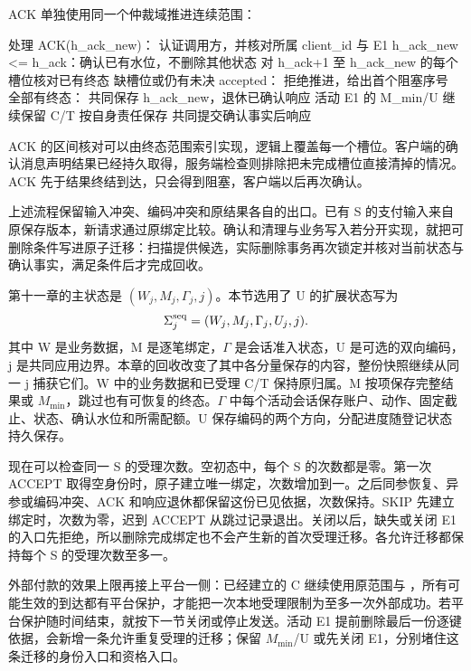 
ACK 单独使用同一个仲裁域推进连续范围：

\begin{BookCode}
处理 ACK(h_ack_new)：
    认证调用方，并核对所属 client_id 与 E1
    h_ack_new <= h_ack：确认已有水位，不删除其他状态
    对 h_ack+1 至 h_ack_new 的每个槽位核对已有终态
    缺槽位或仍有未决 accepted：
        拒绝推进，给出首个阻塞序号
    全部有终态：
        共同保存 h_ack_new，退休已确认响应
        活动 E1 的 M_min/U 继续保留
        C/T 按自身责任保存
    共同提交确认事实后响应
\end{BookCode}

ACK 的区间核对可以由终态范围索引实现，逻辑上覆盖每一个槽位。客户端的确认消息声明结果已经持久取得，服务端检查则排除把未完成槽位直接清掉的情况。ACK 先于结果终结到达，只会得到阻塞，客户端以后再次确认。

上述流程保留输入冲突、编码冲突和原结果各自的出口。已有 S 的支付输入来自原保存版本，新请求通过原绑定比较。确认和清理与业务写入若分开实现，就把可删除条件写进原子迁移：扫描提供候选，实际删除事务再次锁定并核对当前状态与确认事实，满足条件后才完成回收。

第十一章的主状态是 $(W_j,M_j,\Gamma_j,j)$。本节选用了 U 的扩展状态写为
\[
\Sigma^{\rm seq}_j=(W_j,M_j,\Gamma_j,U_j,j).
\]
其中 W 是业务数据，M 是逐笔绑定，$\Gamma$ 是会话准入状态，U 是可选的双向编码，j 是共同应用边界。本章的回收改变了其中各分量保存的内容，整份快照继续从同一 j 捕获它们。W 中的业务数据和已受理 C/T 保持原归属。M 按项保存完整结果或 $M_{\min}$，跳过也有可恢复的终态。$\Gamma$ 中每个活动会话保存账户、动作、固定截止、状态、确认水位和所需配额。U 保存编码的两个方向，分配进度随登记状态持久保存。


现在可以检查同一 S 的受理次数。空初态中，每个 S 的次数都是零。第一次 ACCEPT 取得空身份时，原子建立唯一绑定，次数增加到一。之后同参恢复、异参或编码冲突、ACK 和响应退休都保留这份已见依据，次数保持。SKIP 先建立绑定时，次数为零，迟到 ACCEPT 从跳过记录退出。关闭以后，缺失或关闭 E1 的入口先拒绝，所以删除完成绑定也不会产生新的首次受理迁移。各允许迁移都保持每个 S 的受理次数至多一。

外部付款的效果上限再接上平台一侧：已经建立的 C 继续使用原范围与 ，所有可能生效的到达都有平台保护，才能把一次本地受理限制为至多一次外部成功。若平台保护随时间结束，就按下一节关闭或停止发送。活动 E1 提前删除最后一份逐键依据，会新增一条允许重复受理的迁移；保留 $M_{\min}$/U 或先关闭 E1，分别堵住这条迁移的身份入口和资格入口。


